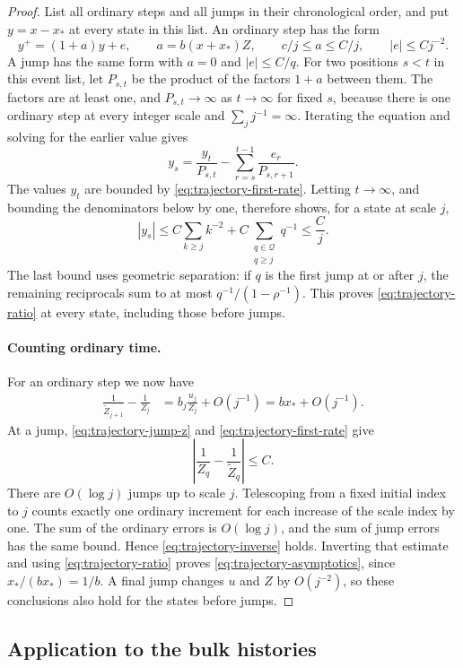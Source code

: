 \begin{proof}
List all ordinary steps and all jumps in their chronological order,
and put $y=x-x_*$ at every state in this list.  An ordinary step
has the form
\[
 y^+=(1+a)y+e,\qquad
 a=b(x+x_*)Z,\qquad c/j\le a\le C/j,
 \qquad |e|\le Cj^{-2}.
\]
A jump has the same form with $a=0$ and $|e|\le C/q$.
For two positions $s<t$ in this event list, let $P_{s,t}$ be the
product of the factors $1+a$ between them.  The factors are at least
one, and $P_{s,t}\to\infty$ as $t\to\infty$ for fixed $s$, because
there is one ordinary step at every integer scale and
$\sum_jj^{-1}=\infty$.  Iterating the equation and solving for the
earlier value gives
\[
 y_s=\frac{y_t}{P_{s,t}}
       -\sum_{r=s}^{t-1}\frac{e_r}{P_{s,r+1}}.
\]
The values $y_t$ are bounded by \eqref{eq:trajectory-first-rate}.
Letting $t\to\infty$, and bounding the denominators below by one,
therefore shows, for a state at scale $j$,
\[
 |y_s|\le
 C\sum_{k\ge j}k^{-2}
   +C\sum_{\substack{q\in\mathcal Q\\q\ge j}}q^{-1}
 \le \frac Cj.
\]
The last bound uses geometric separation: if $q$ is the first jump
at or after $j$, the remaining reciprocals sum to at most
$q^{-1}/(1-\rho^{-1})$.  This proves
\eqref{eq:trajectory-ratio} at every state, including those before
jumps.

\paragraph{Counting ordinary time.}
For an ordinary step we now have
\begin{align*}
 \frac1{\widetilde Z_{j+1}}-\frac1{Z_j}
   &=b_j\frac{u_j}{Z_j}+O(j^{-1})
     =b x_*+O(j^{-1}).
\end{align*}
At a jump, \eqref{eq:trajectory-jump-z} and
\eqref{eq:trajectory-first-rate} give
\[
 \left|\frac1{Z_q}-\frac1{\widetilde Z_q}\right|\le C.
\]
There are $O(\log j)$ jumps up to scale $j$.  Telescoping from a
fixed initial index to $j$ counts exactly one ordinary increment
for each increase of the scale index by one.  The sum of the
ordinary errors is $O(\log j)$, and the sum of jump errors has the
same bound.  Hence \eqref{eq:trajectory-inverse} holds.  Inverting
that estimate and using \eqref{eq:trajectory-ratio} proves
\eqref{eq:trajectory-asymptotics}, since
$x_*/(b x_*)=1/b$.  A final jump changes $u$ and $Z$ by $O(j^{-2})$,
so these conclusions also hold for the states before jumps.
\end{proof}

\subsection{Application to the bulk histories}

